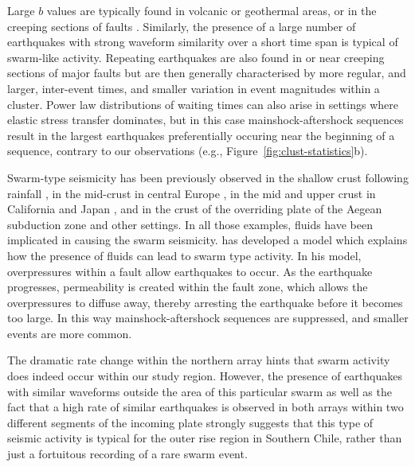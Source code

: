 \documentclass[reviewcopy]{elsart}
\begin{document}
Large $b$ values are typically found in volcanic or geothermal areas, or in
the creeping sections of faults \citep{wiemer02}.  
Similarly, the presence of a large number of earthquakes with strong
waveform similarity over a short time span is typical of
swarm-like activity.  Repeating earthquakes are also found in or near creeping
sections of major faults \citep[e.g.][]{nadeau98} but are then
generally characterised by more regular, and larger, inter-event
times, and smaller variation in event magnitudes within a
cluster. Power law distributions of waiting times can also
arise in settings where elastic stress transfer dominates, but in this
case mainshock-aftershock sequences result in the largest earthquakes
preferentially occuring near the beginning of a sequence, contrary to
our observations (e.g., Figure~\ref{fig:clust-statistics}b). 

Swarm-type seismicity has been
previously observed in the shallow crust following rainfall
\citep{kraft06}, in the mid-crust in central Europe \citep{spicak01}, in
the mid and upper crust in California and Japan \citep{vidale06}, and
in the crust of the overriding plate of the Aegean subduction zone
\citep{becker06} and other settings.  In all those examples,  fluids
have been implicated in causing the swarm seismicity.
  \citet{yamashita99} has developed a model which
explains how the presence of fluids can lead to swarm type activity.
In his model, overpressures within a fault allow earthquakes to
occur.  As the earthquake progresses, permeability is created within the
fault zone, which allows the overpressures to diffuse away, thereby
arresting the earthquake before it becomes too large.  In this way
mainshock-aftershock sequences are suppressed, and smaller events are
more common. 

The dramatic rate change within the northern array hints that swarm
activity does indeed occur within our study region. However, the presence of
 earthquakes with similar waveforms outside the area of this particular swarm as well
as the fact that a high rate of similar earthquakes is observed in
 both arrays within two different segments of the incoming plate
strongly suggests that this type of seismic activity is typical for
the outer rise region in Southern Chile, rather than just a fortuitous
recording of a rare swarm event.
\end{document}
